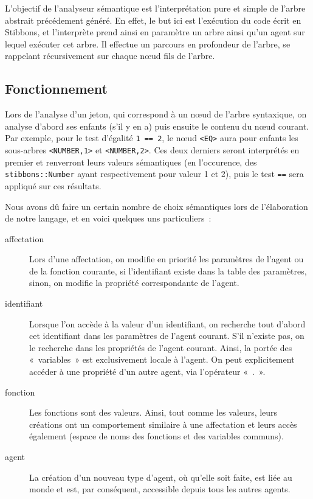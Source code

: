 L'objectif de l'analyseur sémantique est l'interprétation pure et simple de l'arbre abstrait précédement généré. En effet, le but ici est l'exécution du code écrit en Stibbons, et l'interprète prend ainsi en paramètre un arbre ainsi qu'un agent sur lequel exécuter cet arbre. Il effectue un parcours en profondeur de l'arbre, se rappelant récursivement sur chaque nœud fils de l'arbre. 

\subsection{Fonctionnement}
Lors de l'analyse d'un jeton, qui correspond à un nœud de l'arbre syntaxique, on analyse d'abord ses enfants (s'il y en a) puis ensuite le contenu du nœud courant.
Par exemple, pour le test d'égalité \verb|1 == 2|, le nœud \verb|<EQ>| aura pour enfants les sous-arbres \verb|<NUMBER,1>| et \verb|<NUMBER,2>|. Ces deux derniers seront interprétés en premier et renverront leurs valeurs sémantiques (en l'occurence, des \verb|stibbons::Number| ayant respectivement pour valeur 1 et 2), puis le test \verb|==| sera appliqué sur ces résultats.

Nous avons dû faire un certain nombre de choix sémantiques lors de l'élaboration de notre langage, et en voici quelques uns particuliers~:
\begin{description}
\item[affectation] Lors d'une affectation, on modifie en priorité les paramètres de l'agent ou de la fonction courante, si l'identifiant existe dans la table des paramètres, sinon, on modifie la propriété correspondante de l'agent.
\item[identifiant] Lorsque l'on accède à la valeur d'un identifiant, on recherche tout d'abord cet identifiant dans les paramètres de l'agent courant. S'il n'existe pas, on le recherche dans les propriétés de l'agent courant. Ainsi, la portée des «~variables~» est exclusivement locale à l'agent. On peut explicitement accéder à une propriété d'un autre agent, via l'opérateur «~.~».
\item[fonction] Les fonctions sont des valeurs. Ainsi, tout comme les valeurs, leurs créations ont un comportement similaire à une affectation et leurs accès également (espace de noms des fonctions et des variables communs).
\item[agent] La création d'un nouveau type d'agent, où qu'elle soit faite, est liée au monde et est, par conséquent, accessible depuis tous les autres agents.
\end{description}

